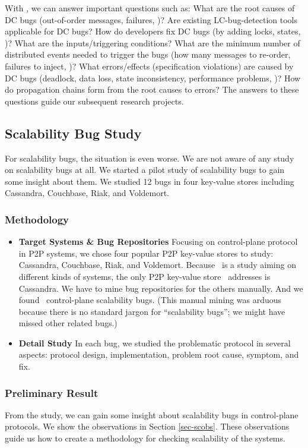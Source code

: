 With \taxdc, we can answer important questions such as: What are the root causes
of DC bugs (out-of-order messages, failures, \etc)?  Are existing
LC-bug-detection tools applicable for DC bugs? How do developers fix DC bugs (by
adding locks, states, \etc)? What are the inputs/triggering conditions?  What
are the minimum number of distributed events needed to trigger the bugs (how
many messages to re-order, failures to inject, \etc)?  What errors/effects
(specification violations) are caused by DC bugs (deadlock, data loss, state
inconsistency, performance problems, \etc)? How do propagation chains form from
the root causes to errors? The answers to these questions guide our subsequent
research projects.

\subsection{Scalability Bug Study}
\label{sc-study}

For scalability bugs, the situation is even worse. We are not aware of any study
on scalability bugs at all. We started a pilot study of scalability bugs to gain
some insight about them. We studied 12 bugs in four key-value stores including
Cassandra, Couchbase, Riak, and Voldemort.

\subsubsection{Methodology}

\begin{itemize}

\item {\bf Target Systems \& Bug Repositories} Focusing on control-plane
protocol in P2P systems, we chose four popular P2P key-value stores to study:
Cassandra, Couchbase, Riak, and Voldemort. Because \cbs\ is a study aiming on
different kinds of systems, the only P2P key-value store \cbs\ addresses is
Cassandra. We have to mine bug repositories for the others manually.  And we
found \numStudy\ control-plane scalability bugs.  (This manual mining was arduous
because there is no standard jargon for ``scalability bugs''; we might have
missed other related bugs.)

\item {\bf Detail Study} In each bug, we studied the problematic protocol in
several aspects: protocol design, implementation, problem root cause, symptom,
and fix.

\end{itemize}

\subsubsection{Preliminary Result}

From the study, we can gain some insight about scalability bugs in control-plane
protocols. We show the observations in Section \ref{sec-scobs}. These
observations guide us how to create a methodology for checking scalability of
the systems.

